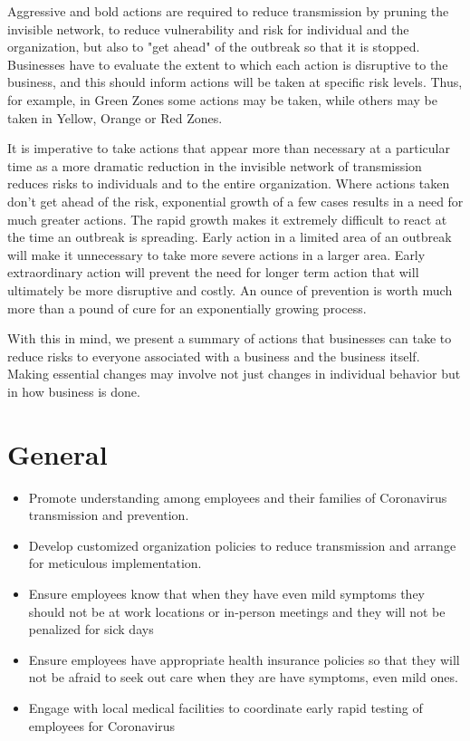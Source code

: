 \documentclass[onecolumn,journal]{IEEEtran}
\begin{document}
\begin{multicols}{2}
Aggressive and bold actions are required to reduce transmission by pruning the invisible network, to reduce vulnerability and risk for individual and the organization, but also to "get ahead" of the outbreak so that it is stopped. Businesses have to evaluate the extent to which each action is disruptive to the business, and this should inform actions will be taken at specific risk levels. Thus, for example, in Green Zones some actions may be taken, while others may be taken in Yellow, Orange or Red Zones.

It is imperative to take actions that appear more than necessary at a particular time as a more dramatic reduction in the invisible network of transmission reduces risks to individuals and to the entire organization. Where actions taken don't get ahead of the risk, exponential growth of a few cases results in a need for much greater actions. The rapid growth makes it extremely difficult to react at the time an outbreak is spreading. Early action in a limited area of an outbreak will make it unnecessary to take more severe actions in a larger area. Early extraordinary action will prevent the need for longer term action that will ultimately be more disruptive and costly. An ounce of prevention is worth much more than a pound of cure for an exponentially growing process.

With this in mind, we present a summary of actions that businesses can take to reduce risks to everyone associated with a business and the business itself. Making essential changes may involve not just changes in individual behavior but in how business is done. 

\section*{General}
\begin{itemize}
    \item Promote understanding among employees and their families of Coronavirus transmission and prevention.
    \item Develop customized organization policies to reduce transmission and arrange for meticulous implementation.
    \item Ensure employees know that when they have even mild symptoms they should not be at work locations or in-person meetings and they will not be penalized for sick days
    \item Ensure employees have appropriate health insurance policies so that they will not be afraid to seek out care when they are have symptoms, even mild ones. 
    \item Engage with local medical facilities to coordinate early rapid testing of employees for Coronavirus
\end{itemize}


\end{multicols}
\end{document}
